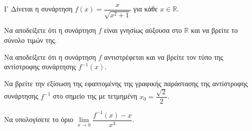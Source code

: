 \begin{thema}{Γ}
Δίνεται η συνάρτηση $f(x) = \dfrac{x}{\sqrt{x^2+1}}$ για κάθε $x \in \mathbb{R}$.
\begin{erwthma}
  \item Να αποδείξετε ότι η συνάρτηση $f$ είναι γνησίως αύξουσα στο $\mathbb{R}$ και να βρείτε το σύνολο τιμών της.
  \item Να αποδείξετε ότι η συνάρτηση $f$ αντιστρέφεται και να βρείτε τον τύπο της αντίστροφης συνάρτησης $f^{-1}(x)$.
  \item Να βρείτε την εξίσωση της εφαπτομένης της γραφικής παράστασης της αντίστροφης συνάρτησης $f^{-1}$ στο σημείο της με τετμημένη $x_0 = \dfrac{\sqrt{2}}{2}$.
  \item Να υπολογίσετε το όριο $\lim\limits_{x \to 0} \dfrac{f^{-1}(x) - x}{x^3}$.
\end{erwthma}
\end{thema}
